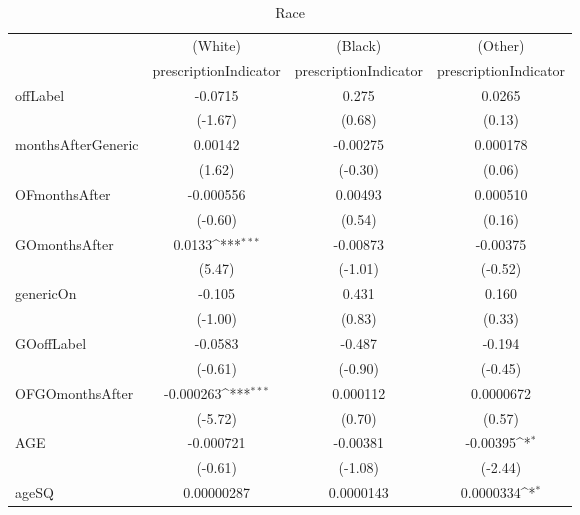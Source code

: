 \begin{table}[htbp]\centering
\def\sym#1{\ifmmode^{#1}\else\(^{#1}\)\fi}
\caption{Race\label{tab1}}
\begin{tabular}{l*{3}{c}}
\hline\hline
            &\multicolumn{1}{c}{(White)}&\multicolumn{1}{c}{(Black)}&\multicolumn{1}{c}{(Other)}\\
            &\multicolumn{1}{c}{prescriptionIndicator}&\multicolumn{1}{c}{prescriptionIndicator}&\multicolumn{1}{c}{prescriptionIndicator}\\
\hline
offLabel    &     -0.0715         &       0.275         &      0.0265         \\
            &     (-1.67)         &      (0.68)         &      (0.13)         \\
[1em]
monthsAfterGeneric&     0.00142         &    -0.00275         &    0.000178         \\
            &      (1.62)         &     (-0.30)         &      (0.06)         \\
[1em]
OFmonthsAfter&   -0.000556         &     0.00493         &    0.000510         \\
            &     (-0.60)         &      (0.54)         &      (0.16)         \\
[1em]
GOmonthsAfter&      0.0133\sym{***}&    -0.00873         &    -0.00375         \\
            &      (5.47)         &     (-1.01)         &     (-0.52)         \\
[1em]
genericOn   &      -0.105         &       0.431         &       0.160         \\
            &     (-1.00)         &      (0.83)         &      (0.33)         \\
[1em]
GOoffLabel  &     -0.0583         &      -0.487         &      -0.194         \\
            &     (-0.61)         &     (-0.90)         &     (-0.45)         \\
[1em]
OFGOmonthsAfter&   -0.000263\sym{***}&    0.000112         &   0.0000672         \\
            &     (-5.72)         &      (0.70)         &      (0.57)         \\
[1em]
AGE         &   -0.000721         &    -0.00381         &    -0.00395\sym{*}  \\
            &     (-0.61)         &     (-1.08)         &     (-2.44)         \\
[1em]
ageSQ       &  0.00000287         &   0.0000143         &   0.0000334\sym{*}  \\

\end{tabular}
\end{table}
